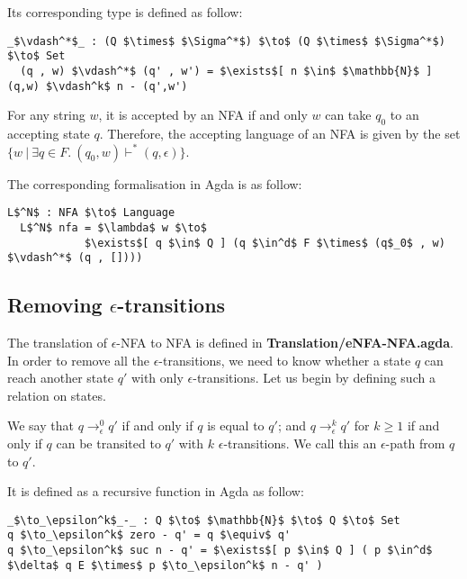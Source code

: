 \par Its corresponding type is defined as follow: 
\begin{lstlisting}[mathescape=true,xleftmargin=.3\textwidth]
  _$\vdash^*$_ : (Q $\times$ $\Sigma^*$) $\to$ (Q $\times$ $\Sigma^*$) $\to$ Set
  (q , w) $\vdash^*$ (q' , w') = $\exists$[ n $\in$ $\mathbb{N}$ ] (q,w) $\vdash^k$ n - (q',w')
\end{lstlisting}

\begin{defn}
\noindent For any string \(w\), it is accepted by an NFA
if and only \(w\) can take \(q_0\) to an accepting state \(q\). Therefore, the
accepting language of an NFA is given by the set \(\{w\ |\ \exists q\in F.\ (q_0,w) \vdash^* (q,\epsilon)\}\). 
\end{defn}

\par The corresponding formalisation in Agda is as follow: 
\begin{lstlisting}[mathescape=true,xleftmargin=.3\textwidth]
  L$^N$ : NFA $\to$ Language
  L$^N$ nfa = $\lambda$ w $\to$ 
            $\exists$[ q $\in$ Q ] (q $\in^d$ F $\times$ (q$_0$ , w) $\vdash^*$ (q , [])))
\end{lstlisting} 


\subsection{Removing \(\epsilon\)-transitions}
\par The translation of \(\epsilon\)-NFA to NFA is defined in
\textbf{Translation/eNFA-NFA.agda}. In order to remove all the \(\epsilon\)-transitions, we need to
know whether a state \(q\) can reach another state \(q'\) with only
\(\epsilon\)-transitions. Let us begin by defining such a relation on states. 

\begin{defn}
\noindent We say that
\(q \to_\epsilon^0 q'\) if and only if
\(q\) is equal to \(q'\); and \(q \to_\epsilon^k q'\) for \(k \geq
1\) if and only if \(q\) can be transited to \(q'\) with \(k\)
\(\epsilon\)-transitions. We call this an \(\epsilon\)-path from \(q\) to \(q'\).
\end{defn}

\par It is defined as a recursive function in Agda as follow:
\begin{lstlisting}[mathescape=true,xleftmargin=.3\textwidth]
_$\to_\epsilon^k$_-_ : Q $\to$ $\mathbb{N}$ $\to$ Q $\to$ Set
q $\to_\epsilon^k$ zero - q' = q $\equiv$ q'
q $\to_\epsilon^k$ suc n - q' = $\exists$[ p $\in$ Q ] ( p $\in^d$ $\delta$ q E $\times$ p $\to_\epsilon^k$ n - q' )
\end{lstlisting}

